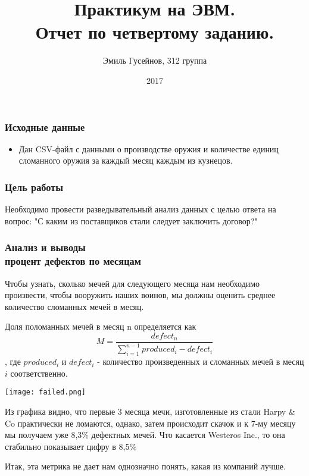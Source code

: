 \documentclass[8pt]{beamer}
\title{Практикум на ЭВМ.\\ Отчет по четвертому заданию.}
\author{ Эмиль Гусейнов, 312 группа }
\institute{МГУ имени М.В. Ломоносова, Москва, Россия}
\date{2017}
\begin{document}
 
\frame{\titlepage}
 
			
	\begin{frame}
		\frametitle{Исходные данные}
		\begin{itemize}
			\item Дан CSV-файл с данными о производстве оружия и количестве единиц сломанного оружия за каждый месяц каждым из кузнецов.
		\end{itemize}
	\end{frame} 

\begin{frame}
\frametitle{Цель работы}
Необходимо провести разведывательный анализ данных с целью ответа на вопрос: "С каким из поставщиков стали следует заключить договор?"
\end{frame}

\begin{frame}
\frametitle{Анализ и выводы\\{ процент дефектов по месяцам}}
	Чтобы узнать, сколько мечей для следующего месяца нам необходимо произвести, чтобы вооружить наших воинов, мы должны оценить среднее количество сломанных мечей в месяц.
	
	Доля поломанных мечей в месяц n определяется как
	$$ M = \frac{defect_{n}}{\sum_{i=1}^{n-1}produced_{i}-defect_{i}} $$,
	где $ produced_{i} $ и $ defect_{i} $ - количество произведенных и сломанных мечей в месяц $ i $ соответственно.
	
	\centerline{\texttt{[image: failed.png]}}
	
Из графика видно, что первые 3 месяца мечи, изготовленные из стали Harpy \& Co практически не ломаются, однако, затем происходит скачок и к 7-му месяцу мы получаем уже 8,3\% дефектных мечей. Что касается Westeros Inc., то она стабильно показывает цифру в 8,5\%

	Итак, эта метрика не дает нам однозначно понять, какая из компаний лучше.

\end{frame}
\end{document}
